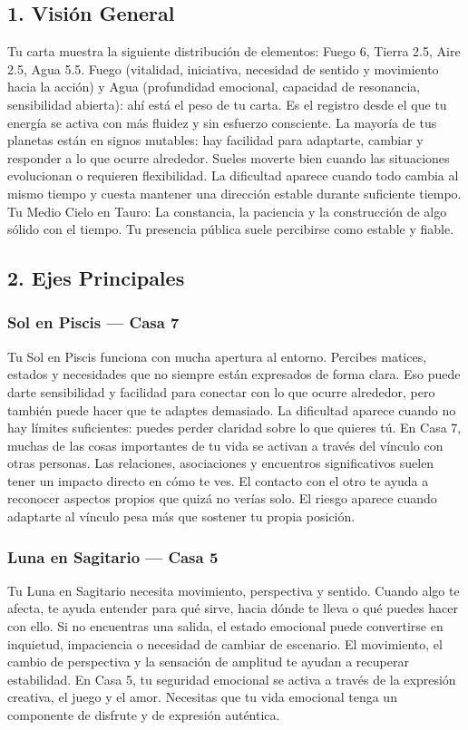 \documentclass[11pt,a4paper]{article}
\begin{document}
\vspace{0.5cm}

\subsection{1. Visión General}

Tu carta muestra la siguiente distribución de elementos: Fuego 6, Tierra 2.5, Aire 2.5, Agua 5.5. Fuego (vitalidad, iniciativa, necesidad de sentido y movimiento hacia la acción) y Agua (profundidad emocional, capacidad de resonancia, sensibilidad abierta): ahí está el peso de tu carta. Es el registro desde el que tu energía se activa con más fluidez y sin esfuerzo consciente. La mayoría de tus planetas están en signos mutables: hay facilidad para adaptarte, cambiar y responder a lo que ocurre alrededor. Sueles moverte bien cuando las situaciones evolucionan o requieren flexibilidad. La dificultad aparece cuando todo cambia al mismo tiempo y cuesta mantener una dirección estable durante suficiente tiempo. Tu Medio Cielo en Tauro: La constancia, la paciencia y la construcción de algo sólido con el tiempo. Tu presencia pública suele percibirse como estable y fiable.

\subsection{2. Ejes Principales}

\subsubsection*{Sol en Piscis — Casa 7}
Tu Sol en Piscis funciona con mucha apertura al entorno. Percibes matices, estados y necesidades que no siempre están expresados de forma clara. Eso puede darte sensibilidad y facilidad para conectar con lo que ocurre alrededor, pero también puede hacer que te adaptes demasiado. La dificultad aparece cuando no hay límites suficientes: puedes perder claridad sobre lo que quieres tú. En Casa 7, muchas de las cosas importantes de tu vida se activan a través del vínculo con otras personas. Las relaciones, asociaciones y encuentros significativos suelen tener un impacto directo en cómo te ves. El contacto con el otro te ayuda a reconocer aspectos propios que quizá no verías solo. El riesgo aparece cuando adaptarte al vínculo pesa más que sostener tu propia posición.

\subsubsection*{Luna en Sagitario — Casa 5}
Tu Luna en Sagitario necesita movimiento, perspectiva y sentido. Cuando algo te afecta, te ayuda entender para qué sirve, hacia dónde te lleva o qué puedes hacer con ello. Si no encuentras una salida, el estado emocional puede convertirse en inquietud, impaciencia o necesidad de cambiar de escenario. El movimiento, el cambio de perspectiva y la sensación de amplitud te ayudan a recuperar estabilidad. En Casa 5, tu seguridad emocional se activa a través de la expresión creativa, el juego y el amor. Necesitas que tu vida emocional tenga un componente de disfrute y de expresión auténtica.
\end{document}
